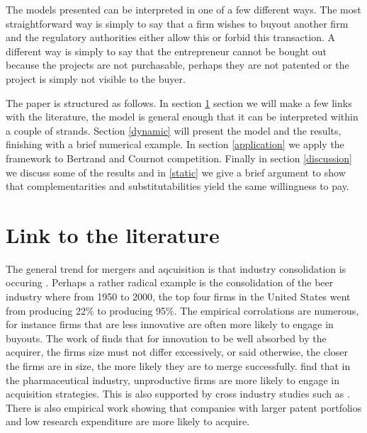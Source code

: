 The models presented can be interpreted in one of a few different ways. The most straightforward way is simply to say that a firm wishes to buyout another firm and the regulatory authorities either allow this or forbid this transaction. A different way is simply to say that the entrepreneur cannot be bought out because the projects are not purchasable, perhaps they are not patented or the project is simply not visible to the buyer. 







The paper is structured as follows. 
In section \ref{literature} section we will make a few links with the literature, the model is general enough that it can be interpreted within a couple of strands. Section \ref{dynamic} will present the model and the results, finishing with a brief numerical example. In section \ref{application} we apply the framework to Bertrand and Cournot competition. Finally in section \ref{discussion} we discuss some of the results and in \ref{static} we give a brief argument to show that complementarities and substitutabilities yield the same willingness to pay.

\section{Link to the literature}\label{literature}

The general trend for mergers and aqcuisition is that industry consolidation is occuring \citep{white2002trends}. Perhaps a rather radical example is the consolidation of the beer industry where from 1950 to 2000, the top four firms in the United States went from producing 22\% to producing 95\%. The empirical corrolations are numerous, for instance firms that are less innovative are often more likely to engage in buyouts. The work of \cite{Gerpott1995} finds that for innovation to be well absorbed by the acquirer, the firms size must not differ excessively, or said otherwise, the closer the firms are in size, the more likely they are to merge successfully. \cite{Higgins2006} find that in the pharmaceutical industry, unproductive firms are more likely to engage in acquisition strategies. This is also supported by cross industry studies such as \cite{Zhao2009}. There is also empirical work showing that companies with larger patent portfolios and low research expenditure are more likely to acquire\citep{Bena2014}. 

